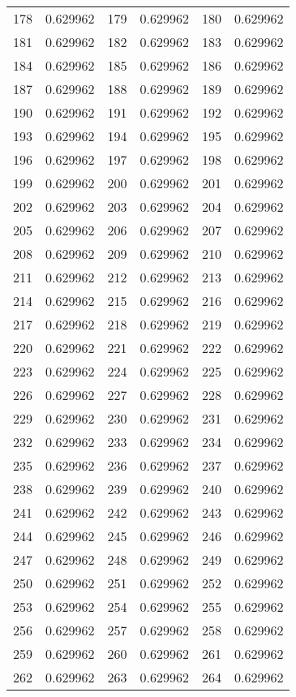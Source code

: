 \documentclass[12pt]{article}
\begin{document}
\begin{longtable}{@{}cc|cc|cc@{}}
178 & 0.629962 & 179 & 0.629962 & 180 & 0.629962 \\
181 & 0.629962 & 182 & 0.629962 & 183 & 0.629962 \\
184 & 0.629962 & 185 & 0.629962 & 186 & 0.629962 \\
187 & 0.629962 & 188 & 0.629962 & 189 & 0.629962 \\
190 & 0.629962 & 191 & 0.629962 & 192 & 0.629962 \\
193 & 0.629962 & 194 & 0.629962 & 195 & 0.629962 \\
196 & 0.629962 & 197 & 0.629962 & 198 & 0.629962 \\
199 & 0.629962 & 200 & 0.629962 & 201 & 0.629962 \\
202 & 0.629962 & 203 & 0.629962 & 204 & 0.629962 \\
205 & 0.629962 & 206 & 0.629962 & 207 & 0.629962 \\
208 & 0.629962 & 209 & 0.629962 & 210 & 0.629962 \\
211 & 0.629962 & 212 & 0.629962 & 213 & 0.629962 \\
214 & 0.629962 & 215 & 0.629962 & 216 & 0.629962 \\
217 & 0.629962 & 218 & 0.629962 & 219 & 0.629962 \\
220 & 0.629962 & 221 & 0.629962 & 222 & 0.629962 \\
223 & 0.629962 & 224 & 0.629962 & 225 & 0.629962 \\
226 & 0.629962 & 227 & 0.629962 & 228 & 0.629962 \\
229 & 0.629962 & 230 & 0.629962 & 231 & 0.629962 \\
232 & 0.629962 & 233 & 0.629962 & 234 & 0.629962 \\
235 & 0.629962 & 236 & 0.629962 & 237 & 0.629962 \\
238 & 0.629962 & 239 & 0.629962 & 240 & 0.629962 \\
241 & 0.629962 & 242 & 0.629962 & 243 & 0.629962 \\
244 & 0.629962 & 245 & 0.629962 & 246 & 0.629962 \\
247 & 0.629962 & 248 & 0.629962 & 249 & 0.629962 \\
250 & 0.629962 & 251 & 0.629962 & 252 & 0.629962 \\
253 & 0.629962 & 254 & 0.629962 & 255 & 0.629962 \\
256 & 0.629962 & 257 & 0.629962 & 258 & 0.629962 \\
259 & 0.629962 & 260 & 0.629962 & 261 & 0.629962 \\
262 & 0.629962 & 263 & 0.629962 & 264 & 0.629962 \\

\end{longtable}
\end{document}
